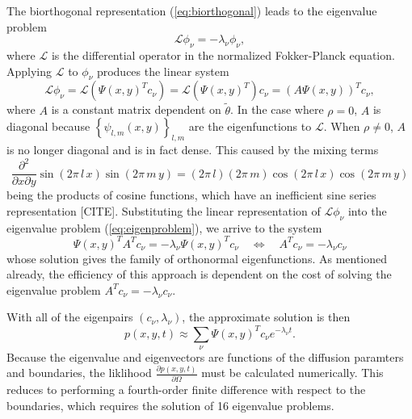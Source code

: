 \documentclass[10pt]{article}
\begin{document}
The biorthogonal representation (\ref{eq:biorthogonal}) leads to the
eigenvalue problem
\begin{equation}
  \mathcal{L} \phi_\nu = -\lambda_\nu \phi_\nu, \label{eq:eigenproblem}
\end{equation}
where $\mathcal{L}$ is the differential operator in the normalized
Fokker-Planck equation. Applying $\mathcal{L}$ to $\phi_\nu$ produces
the linear system
\[
  \mathcal{L}\phi_\nu = \mathcal{L}(\Psi(x,y)^T c_\nu) =
  \mathcal{L}(\Psi(x,y)^T) c_\nu = (A \Psi(x,y))^T c_\nu,
\] 
where $A$ is a constant matrix dependent on $\tilde{\theta}$. In the
case where $\rho = 0$, $A$ is diagonal because
$\left\{ \psi_{l,m}(x,y) \right\}_{l,m}$ are the eigenfunctions to
$\mathcal{L}$. When $\rho \neq 0$, $A$ is no longer diagonal and is in
fact dense. This caused by the mixing terms
\[
  \frac{\partial^2}{\partial x \partial y} \sin\left(2\pi\, l\,
    x\right) \sin\left(2\pi\, m\, y\right) = (2\pi\, l)(2\pi\, m)
  \cos\left(2\pi\, l\, x\right) \cos\left(2\pi\, m\, y\right)
\]
being the products of cosine functions, which have an inefficient sine
series representation [CITE]. Substituting the linear representation
of $\mathcal{L}\phi_\nu$ into the eigenvalue problem
(\ref{eq:eigenproblem}), we arrive to the system
\[
  \Psi(x,y)^T A^T c_\nu = -\lambda_\nu \Psi(x,y)^T c_\nu
  \quad \Leftrightarrow \quad A^T c_\nu = -\lambda_\nu c_\nu
\]
whose solution gives the family of orthonormal eigenfunctions. As
mentioned already, the efficiency of this approach is dependent on the
cost of solving the eigenvalue problem
$A^T c_\nu = -\lambda_\nu c_\nu$.

With all of the eigenpairs $(c_\nu, \lambda_\nu)$, the approximate solution is then
\[
  p(x,y,t) \approx \sum_{\nu}\Psi(x,y)^T c_\nu e^{-\lambda_\nu t}.
\]
Because the eigenvalue and eigenvectors are functions of the diffusion
paramters and boundaries, the liklihood
$\frac{\partial p(x,y,t)}{\partial \Omega}$ must be calculated
numerically. This reduces to performing a fourth-order finite
difference with respect to the boundaries, which requires the solution
of 16 eigenvalue problems.
\end{document}
